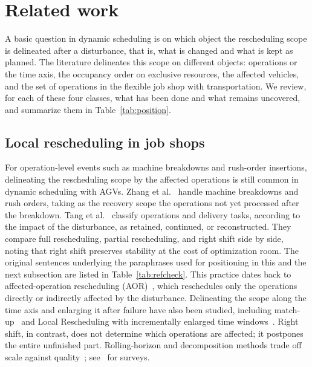 \section{Related work}
\label{sec:related_work}


A basic question in dynamic scheduling is on which object the rescheduling scope is delineated after a disturbance, that is, what is changed and what is kept as planned.
The literature delineates this scope on different objects: operations or the time axis, the occupancy order on exclusive resources,
the affected vehicles, and the set of operations in the flexible job shop with transportation.
We review, for each of these four classes, what has been done and what remains uncovered, and summarize them in Table~\ref{tab:position}.

\subsection{Local rescheduling in job shops}
\label{sec:rw_aor}

For operation-level events such as machine breakdowns and rush-order insertions, delineating the rescheduling scope by the affected operations is still common in dynamic scheduling with AGVs.
Zhang et al.~\cite{zhang2023energy} handle machine breakdowns and rush orders, taking as the recovery scope the operations not yet processed after the breakdown.
Tang et al.~\cite{tang2026dynamic} classify operations and delivery tasks, according to the impact of the disturbance, as retained, continued, or reconstructed.
They compare full rescheduling, partial rescheduling, and right shift side by side, noting that right shift preserves stability at the cost of optimization room.
The original sentences underlying the paraphrases used for positioning in this and the next subsection are listed in Table~\ref{tab:refcheck}.
This practice dates back to affected-operation rescheduling (AOR)~\cite{abumaizar1997rescheduling,subramaniam2003maor},
which reschedules only the operations directly or indirectly affected by the disturbance.
Delineating the scope along the time axis and enlarging it after failure have also been studied, including match-up~\cite{akturk1999matchup}
and Local Rescheduling with incrementally enlarged time windows~\cite{kuster2007local}.
Right shift, in contrast, does not determine which operations are affected; it postpones the entire unfinished part.
Rolling-horizon and decomposition methods trade off scale against quality~\cite{zeitrag2025novel,zhao2019decomposition};
see~\cite{vieira2003rescheduling,ouelhadj2009survey} for surveys.


